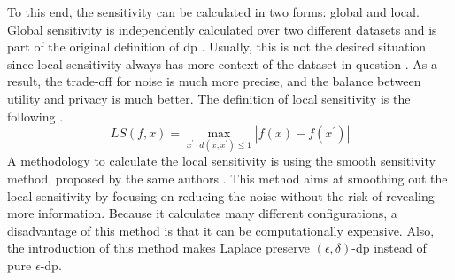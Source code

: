 To this end, the sensitivity can be calculated in two forms: global and local.
Global sensitivity is independently calculated over two different datasets and is part of the original definition of \gls{dp} \citep{dwork_differential_2006}.
Usually, this is not the desired situation since local sensitivity always has more context of the dataset in question \citep{nissim_smooth_2007}.
As a result, the trade-off for noise is much more precise, and the balance between utility and privacy is much better.
The definition of local sensitivity is the following \citep{nissim_smooth_2007}.
\begin{equation}
  LS(f,x)=\operatorname*{max}_{x^{\prime}\cdot d(x,x^{\prime})\leq1}|f(x)-f(x^{\prime})|
  \label{local-sensitivity}
\end{equation}
A methodology to calculate the local sensitivity is using the smooth sensitivity method, proposed by the same authors \citep{nissim_smooth_2007}.
This method aims at smoothing out the local sensitivity by focusing on reducing the noise without the risk of revealing more information.
Because it calculates many different configurations, a disadvantage of this method is that it can be computationally expensive.
Also, the introduction of this method makes Laplace preserve $(\epsilon, \delta)$-\gls{dp} instead of pure $\epsilon$-\gls{dp}.



\newpage
